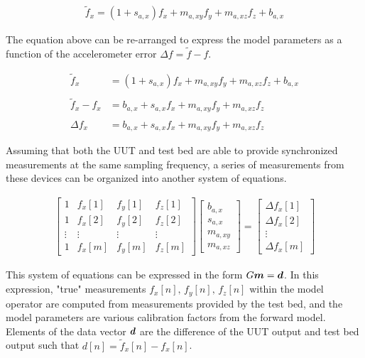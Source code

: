 \begin{align*}
	\tilde{f}_x = \left(1 + s_{a,x}\right) f_x + m_{a,xy} f_y + m_{a,xz} f_z + b_{a,x}
\end{align*}

The equation above can be re-arranged to express the model parameters as a function of the accelerometer error $\Delta f = \tilde{f} - f$. 

\begin{align*}
	\tilde{f}_x &= \left(1 + s_{a,x}\right) f_x + m_{a,xy} f_y + m_{a,xz} f_z + b_{a,x} \\
	\\
	\tilde{f}_x - f_x &= b_{a,x} + s_{a,x} f_x + m_{a,xy} f_y + m_{a,xz} f_z \\
	\\
	\Delta f_x &= b_{a,x} + s_{a,x} f_x + m_{a,xy} f_y + m_{a,xz} f_z
\end{align*}

Assuming that both the UUT and test bed are able to provide synchronized measurements at the same sampling frequency, a series of measurements from these devices can be organized into another system of equations. 

\begin{align} \label{eq: expanded block of GM = d}
	\begin{bmatrix} 
		1 & f_x[1] & f_y[1] & f_z[1] \\ 1 & f_x[2] & f_y[2] & f_z[2] \\ \vdots & \vdots & \vdots & \vdots \\ 1 & f_x[m] & f_y[m] & f_z[m]
	\end{bmatrix} \begin{bmatrix}
		b_{a,x} \\ s_{a,x} \\ m_{a,xy} \\ m_{a,xz}
	\end{bmatrix} = \begin{bmatrix}
		\Delta f_x[1] \\ \Delta f_x[2] \\ \vdots \\ \Delta f_x[m]
	\end{bmatrix}
\end{align}

This system of equations can be expressed in the form $G\boldsymbol{m} = \boldsymbol{d}$. In this expression, "true" measurements $f_x[n],\,f_y[n],\,f_z[n]$ within the model operator are computed from measurements provided by the test bed, and the model parameters are various calibration factors from the forward model. Elements of the data vector $\boldsymbol{d}$ are the difference of the UUT output and test bed output such that $d[n] = \tilde{f}_x[n] - f_x[n]$.

